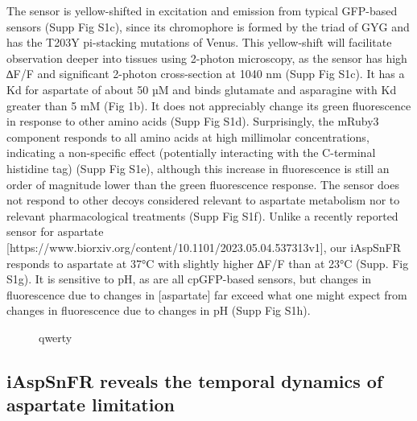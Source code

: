 \documentclass[9pt,lineno]{elife}
\begin{document}
The sensor is yellow-shifted in excitation and emission from typical GFP-based sensors (Supp Fig S1c), since its chromophore is formed by the triad of GYG and has the T203Y pi-stacking mutations of Venus.
This yellow-shift will facilitate observation deeper into tissues using 2-photon microscopy, as the sensor has high ∆F/F and significant 2-photon cross-section at 1040 nm (Supp Fig S1c).
It has a Kd for aspartate of about 50 µM and binds glutamate and asparagine with Kd greater than 5 mM (Fig 1b). It does not appreciably change its green fluorescence in response to other amino acids (Supp Fig S1d).
Surprisingly, the mRuby3 component responds to all amino acids at high millimolar concentrations, indicating a non-specific effect (potentially interacting with the C-terminal histidine tag) (Supp Fig S1e), although this increase in fluorescence is still an order of magnitude lower than the green fluorescence response.
The sensor does not respond to other decoys considered relevant to aspartate metabolism nor to relevant pharmacological treatments (Supp Fig S1f). Unlike a recently reported sensor for aspartate [https://www.biorxiv.org/content/10.1101/2023.05.04.537313v1], our iAspSnFR responds to aspartate at 37°C with slightly higher ∆F/F than at 23°C (Supp. Fig S1g).
It is sensitive to pH, as are all cpGFP-based sensors, but changes in fluorescence due to changes in [aspartate] far exceed what one might expect from changes in fluorescence due to changes in pH (Supp Fig S1h).


\begin{figure}[ht!]
\centering
{}
\caption{qwerty}
\label{fig:Fig1}
\end{figure}







\subsection{iAspSnFR reveals the temporal dynamics of aspartate limitation}
\lipsum[5]

\end{document}
